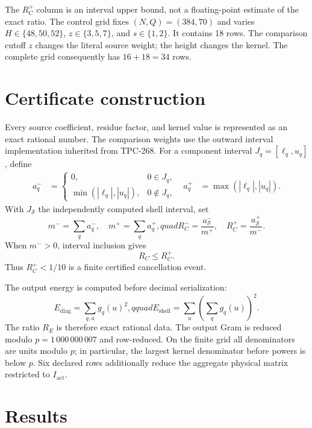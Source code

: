 \documentclass[11pt]{article}
\newcommand{\shell}{\mathcal S}
\newcommand{\activeset}{I_{\mathrm{act}}}
\begin{document}
The $R_C^+$ column is an interval upper bound, not a floating-point estimate
of the exact ratio.  The control grid fixes $(N,Q)=(384,70)$ and varies
$H\in\{48,50,52\}$, $z\in\{3,5,7\}$, and $s\in\{1,2\}$.  It contains 18
rows.  The comparison cutoff $z$ changes the literal source weight; the
height changes the kernel.  The complete grid consequently has
$16+18=34$ rows.

\section{Certificate construction}

Every source coefficient, residue factor, and kernel value is represented as
an exact rational number.  The comparison weights use the outward interval
implementation inherited from TPC-268.  For a component interval
$J_q=[\ell_q,u_q]$, define
\begin{align}
 a_q^-&=\begin{cases}0,&0\in J_q,\\
 \min(|\ell_q|,|u_q|),&0\notin J_q,\end{cases}&
 a_q^+&=\max(|\ell_q|,|u_q|).
 \label{eq:absinterval}
\end{align}
With $J_{\shell}$ the independently computed shell interval, set
\begin{equation}
 m^- =\sum_q a_q^-,\quad
 m^+=\sum_q a_q^+,quad
 R_C^- =\frac{a_{\shell}^-}{m^+},\quad
 R_C^+ =\frac{a_{\shell}^+}{m^-}.
 \label{eq:ret}
\end{equation}
When $m^->0$, interval inclusion gives
\begin{equation}
 R_C\leq R_C^+.
 \label{eq:retupper}
\end{equation}
Thus $R_C^+<1/10$ is a finite certified cancellation event.

The output energy is computed before decimal serialization:
\begin{equation}
 E_{\mathrm{diag}}=\sum_{q,u}g_q(u)^2,qquad
 E_{\mathrm{shell}}=\sum_u\left(\sum_qg_q(u)\right)^2.
 \label{eq:exactenergy}
\end{equation}
The ratio $R_E$ is therefore exact rational data.  The output Gram is reduced
modulo $p=1\,000\,000\,007$ and row-reduced.  On the finite grid all
denominators are units modulo $p$; in particular, the largest kernel
denominator before powers is below $p$.  Six declared rows additionally
reduce the aggregate physical matrix restricted to $\activeset$.

\section{Results}
\end{document}
